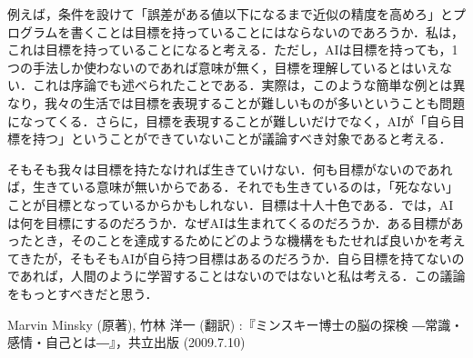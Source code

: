 \documentclass{jarticle}
\begin{document}
例えば，条件を設けて「誤差がある値以下になるまで近似の精度を高めろ」とプログラムを書くことは目標を持っていることにはならないのであろうか．私は，これは目標を持っていることになると考える．ただし，AIは目標を持っても，1つの手法しか使わないのであれば意味が無く，目標を理解しているとはいえない．これは序論でも述べられたことである．実際は，このような簡単な例とは異なり，我々の生活では目標を表現することが難しいものが多いということも問題になってくる．さらに，目標を表現することが難しいだけでなく，AIが「自ら目標を持つ」ということができていないことが議論すべき対象であると考える．

そもそも我々は目標を持たなければ生きていけない．何も目標がないのであれば，生きている意味が無いからである．それでも生きているのは，「死なない」ことが目標となっているからかもしれない．目標は十人十色である．では，AIは何を目標にするのだろうか．なぜAIは生まれてくるのだろうか．ある目標があったとき，そのことを達成するためにどのような機構をもたせれば良いかを考えてきたが，そもそもAIが自ら持つ目標はあるのだろうか．自ら目標を持てないのであれば，人間のように学習することはないのではないと私は考える．この議論をもっとすべきだと思う．




\begin{thebibliography}{n}
Marvin Minsky (原著), 竹林 洋一 (翻訳) :『ミンスキー博士の脳の探検 ―常識・感情・自己とは―』，共立出版 (2009.7.10)

\end{thebibliography}
\end{document}
